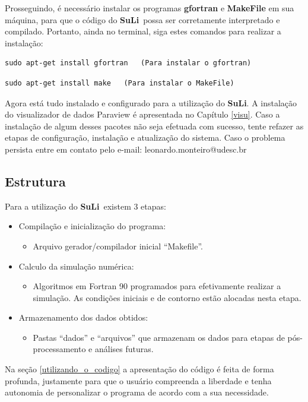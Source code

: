\documentclass[12pt, a4paper]{article}
\newcommand{\SL}{{\bf SuLi}}
\begin{document}
Prosseguindo, é necessário instalar os programas {\bf gfortran} e {\bf MakeFile} em sua máquina, para que o código do \SL\ possa ser corretamente interpretado e compilado. Portanto, ainda no terminal, siga estes comandos para realizar a instalação:

\begin{verbatim}
sudo apt-get install gfortran	(Para instalar o gfortran)
\end{verbatim}

\begin{verbatim}
sudo apt-get install make	(Para instalar o MakeFile)
\end{verbatim}

Agora está tudo instalado e configurado para a utilização do \SL. A instalação do visualizador de dados Paraview é apresentada no Capítulo \ref{visu}. Caso a instalação de algum desses pacotes não seja efetuada com sucesso, tente refazer as etapas de configuração, instalação e atualização do sistema. Caso o problema persista entre em contato pelo e-mail: leonardo.monteiro@udesc.br

\subsection{Estrutura}
Para a utilização do \SL\ existem 3 etapas:
\begin{itemize}
	\item Compilação e inicialização do programa:
		\begin{itemize}
			\item Arquivo gerador/compilador inicial ``Makefile''.
		\end{itemize}
	\item Calculo da simulação numérica:
		\begin{itemize}
			\item Algoritmos em Fortran 90 programados para efetivamente realizar a simulação. As condições iniciais e de contorno estão alocadas nesta etapa.
		\end{itemize}
	\item Armazenamento dos dados obtidos:
		\begin{itemize}
			\item Pastas ``dados'' e ``arquivos'' que armazenam os dados para etapas de pós-processamento e análises futuras.
		\end{itemize}
\end{itemize}
Na seção \ref{utilizando_o_codigo} a apresentação do código é feita de forma profunda, justamente para que o usuário compreenda a liberdade e tenha autonomia de personalizar o programa de acordo com a sua necessidade.
\end{document}
